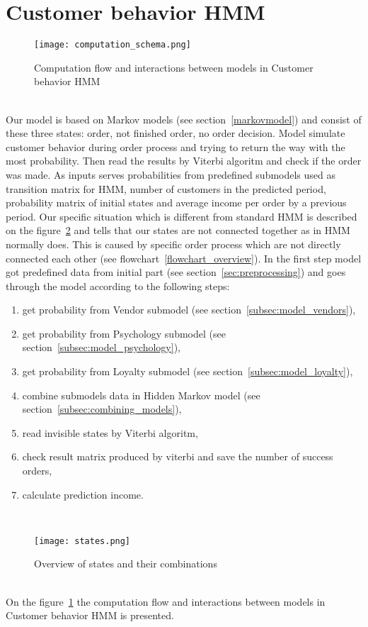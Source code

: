 \section{Customer behavior HMM} \label{sec:submodels}
\begin{figure}[h!]
    \begin{center}
        \texttt{[image: computation\_schema.png]}
    \end{center}
    \caption{Computation flow and interactions between models in Customer behavior HMM}
    \label{Model schema with interaction}
\end{figure}\\
Our model is based on Markov models (see section~\ref{markovmodel}) and consist of these three states: order, not finished order, no order decision.
Model simulate customer behavior during order process and trying to return the way with the most probability.
Then read the results by Viterbi algoritm and check if the order was made.
As inputs serves probabilities from predefined submodels used as transition matrix for HMM, number of customers in the predicted period,
probability matrix of initial states and average income per order by a previous period.
Our specific situation which is different from standard HMM is described on the figure~\ref{states} and tells that our states are not connected together as in HMM normally does.
This is caused by specific order process which are not directly connected each other (see flowchart~\ref{flowchart_overview}).
In the first step model got predefined data from initial part (see section~\ref{sec:preprocessing}) and goes through the model according to the following steps:
\begin{enumerate}
    \item get probability from Vendor submodel (see section~\ref{subsec:model_vendors}),
    \item get probability from Psychology submodel (see section~\ref{subsec:model_psychology}),
    \item get probability from Loyalty submodel (see section~\ref{subsec:model_loyalty}),
    \item combine submodels data in Hidden Markov model (see section~\ref{subsec:combining_models}),
    \item read invisible states by Viterbi algoritm,
    \item check result matrix produced by viterbi and save the number of success orders,
    \item calculate prediction income.
\end{enumerate}\\
\begin{figure}[h!]
    \begin{center}
        \texttt{[image: states.png]}
    \end{center}
    \caption{Overview of states and their combinations}
    \label{states}
\end{figure}\\
On the figure~\ref{Model schema with interaction} the computation flow and interactions between models in Customer behavior HMM is presented.\\
